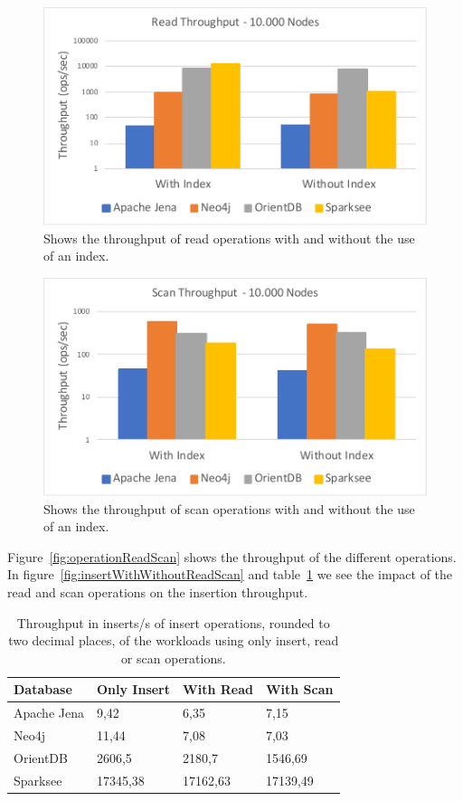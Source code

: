 \begin{figure}[h!]
  \centering
  \includegraphics[width=.75\textwidth]{images/responsiveness/readThroughput10000Nodes}
  \caption{Shows the throughput of read operations with and without the use of an index.}
  \label{fig:readThroughput10000Nodes}
\end{figure}

\begin{figure}[h!]
  \centering
  \includegraphics[width=.75\textwidth]{images/responsiveness/scanThroughput10000Nodes}
  \caption{Shows the throughput of scan operations with and without the use of an index.}
  \label{fig:scanThroughput10000Nodes}
\end{figure}

Figure~\ref{fig:operationReadScan} shows the throughput of the different operations.
In figure~\ref{fig:insertWithWithoutReadScan} and table~\ref{tab:insertWithWithoutReadScan} we see the impact of the read and scan operations on the insertion throughput.

\begin{table}[h!]
  \begin{minipage}{\textwidth}
    \centering
    \begin{tabular}{ | l | l | l | l | }
      \hline
      Database & Only Insert & With Read & With Scan \\ \hline
      Apache Jena & 9,42 & 6,35 & 7,15 \\ \hline
      Neo4j & 11,44 & 7,08 & 7,03 \\ \hline
      OrientDB & 2606,5 & 2180,7 & 1546,69 \\ \hline
      Sparksee & 17345,38 & 17162,63 & 17139,49 \\ \hline
    \end{tabular}
  \end{minipage}
  \caption{Throughput in inserts/s of insert operations, rounded to two decimal places, of the workloads using only insert, read or scan operations.}
  \label{tab:insertWithWithoutReadScan}
\end{table}

